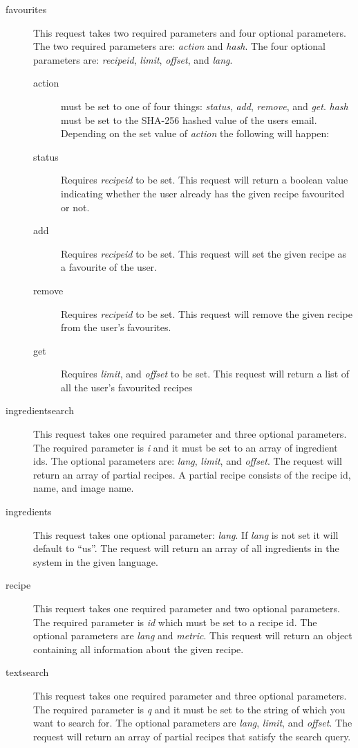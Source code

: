 \begin{description}
\item[favourites] This request takes two required parameters and four optional parameters. The two required parameters are: \textit{action} and \textit{hash}. The four optional parameters are: \textit{recipeid}, \textit{limit}, \textit{offset}, and \textit{lang}.

\begin{description}
\item[action] must be set to one of four things: \textit{status}, \textit{add}, \textit{remove}, and \textit{get}. \textit{hash} must be set to the SHA-256 hashed value of the users email.
Depending on the set value of \textit{action} the following will happen:
\item[status] Requires \textit{recipeid} to be set. This request will return a boolean value indicating whether the user already has the given recipe favourited or not.
\item[add] Requires \textit{recipeid} to be set. This request will set the given recipe as a favourite of the user.
\item[remove] Requires \textit{recipeid} to be set. This request will remove the given recipe from the user's favourites.
\item[get] Requires \textit{limit}, and \textit{offset} to be set. This request will return a list of all the user's favourited recipes
\end{description}

\item[ingredientsearch] This request takes one required parameter and three optional parameters. The required parameter is \textit{i} and it must be set to an array of ingredient ids. The optional parameters are: \textit{lang}, \textit{limit}, and \textit{offset}. The request will return an array of partial recipes. A partial recipe consists of the recipe id, name, and image name.
\item[ingredients] This request takes one optional parameter: \textit{lang}. If \textit{lang} is not set it will default to ``us''. The request will return an array of all ingredients in the system in the given language.
\item[recipe] This request takes one required parameter and two optional parameters. The required parameter is \textit{id} which must be set to a recipe id. The optional parameters are \textit{lang} and \textit{metric}. This request will return an object containing all information about the given recipe.
\item[textsearch] This request takes one required parameter and three optional parameters. The required parameter is \textit{q} and it must be set to the string of which you want to search for. The optional parameters are \textit{lang}, \textit{limit}, and \textit{offset}. The request will return an array of partial recipes that satisfy the search query.
\end{description}



